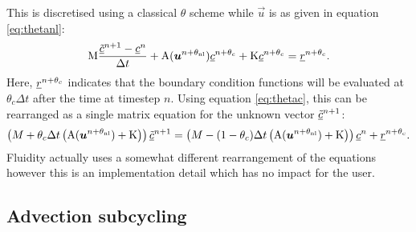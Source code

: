 This is discretised using a classical $\theta$ scheme while $\vec u$ is as
given in equation \eqref{eq:thetanl}:
\begin{equation}
  \mathrm{M} \frac{\underline{\tilde c}^{n+1}-\underline{c}^{n}}{\Delta t}
  +\mathrm{A}({\mbox{\boldmath$u$}}^{n+\theta_{\mathrm{nl}}})\underline{c}^{n+\theta_c}+\mathrm{K}\underline{c}^{n+\theta_c}=\underline{r}^{n+\theta_c}.
\end{equation}
Here, $\underline{r}^{n+\theta_c}$ indicates that the boundary condition
functions will be evaluated at $\theta_c\Delta t$ after the time at timestep
$n$. Using equation \eqref{eq:thetac}, this can be rearranged as a single
matrix equation for the unknown vector $\underline{\tilde c}^{n+1}$:
\begin{equation}
  \left(M+\theta_c\Delta t\left(\mathrm{A}({\mbox{\boldmath$u$}}^{n+\theta_{\mathrm{nl}}})+\mathrm{K}\right)\right)\underline{\tilde c}^{n+1}
  =\left(M-(1-\theta_c)\Delta
    t\left(\mathrm{A}({\mbox{\boldmath$u$}}^{n+\theta_{\mathrm{nl}}})+\mathrm{K}\right)\right)\underline{c}^{n} +\underline{r}^{n+\theta_c}.
\end{equation}
Fluidity actually uses a somewhat different rearrangement of the equations
however this is an implementation detail which has no impact for the user.

\subsection{Advection subcycling}

